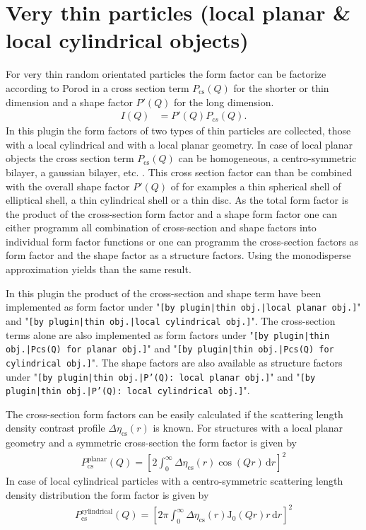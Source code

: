 \section{Very thin particles (local planar \& local cylindrical objects)}
\label{sec:very_anisotropic_particles}
For very thin random orientated particles the form factor
can be factorize according to Porod \cite{Porod1948} in a cross
section term $P_\text{cs}(Q)$ for the shorter or thin dimension and a
shape factor $P'(Q)$ for the long dimension.
\begin{align}
\label{eq:PprimePcs}
I(Q) &=P'(Q) P_{cs}(Q).
\end{align}
In this plugin the form factors of two types of thin
particles are collected, those with a local cylindrical and with a
local planar geometry. In case of local planar objects the cross
section term $P_\text{cs}(Q)$ can be homogeneous, a
centro-symmetric bilayer, a gaussian bilayer, etc. . This cross
section factor can than be combined with the overall shape factor
$P'(Q)$ of for examples a thin spherical shell of elliptical
shell, a thin cylindrical shell or a thin disc. As the total form
factor is the product of the cross-section form factor and a shape
form factor one can either programm all combination of
cross-section and shape factors into individual form factor
functions or one can programm the cross-section factors as form
factor and the shape factor as a structure factors. Using the
monodisperse approximation yields than the same result.

In this plugin the product of the cross-section and shape term
have been implemented as form factor under "\texttt{[by
plugin|thin obj.|local planar obj.]}" and "\texttt{[by
plugin|thin obj.|local cylindrical obj.]}". The
cross-section terms alone are also implemented as form factors
under "\texttt{[by plugin|thin obj.|Pcs(Q) for planar obj.]}"
and "\texttt{[by plugin|thin obj.|Pcs(Q) for cylindrical
obj.]}". The shape factors are also available as structure factors
under "\texttt{[by plugin|thin obj.|P'(Q): local planar
obj.]}" and "\texttt{[by plugin|thin obj.|P'(Q): local
cylindrical obj.]}".

The cross-section form factors can be easily calculated if the
scattering length density contrast profile
$\Delta\eta_\textrm{cs}(r)$ is known. For structures with a local
planar geometry and a symmetric cross-section the form factor is
given by
\begin{align}
P_\textrm{cs}^\textrm{planar} (Q) = \left[2\int_0^\infty
\Delta\eta_\textrm{cs}(r) \cos(Qr) \, \textrm{d}r\right]^2
\label{Pcs:planar}
\end{align}
In case of local cylindrical particles with a centro-symmetric
scattering length density distribution the form factor is given by
\begin{align}
P_\textrm{cs}^\textrm{cylindrical} (Q) = \left[2\pi\int_0^\infty
\Delta\eta_\textrm{cs}(r) \textrm{J}_0(Qr)r \,
\textrm{d}r\right]^2 \label{Pcs:cylindrical}
\end{align}

